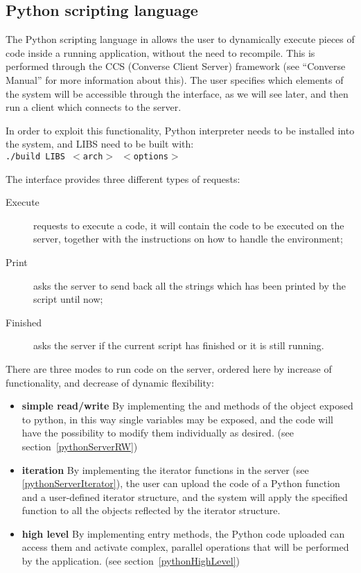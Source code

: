 \subsection{Python scripting language}

\label{python}

The Python scripting language in \charmpp{} allows the user to dynamically
execute pieces of code inside a running application, without the need to
recompile. This is performed through the CCS (Converse Client Server) framework
(see ``Converse Manual'' for more information about this). The user specifies
which elements of the system will be accessible through the interface, as we
will see later, and then run a client which connects to the server.

In order to exploit this functionality, Python interpreter needs to be installed
into the system, and \charmpp{} LIBS need to be built with:\\
\texttt{./build LIBS $<$arch$>$ $<$options$>$}

The interface provides three different types of requests:

\begin{description}
\item[Execute] requests to execute a code, it will contain the code to be executed on the server, together with the instructions on how to handle the environment;
\item[Print] asks the server to send back all the strings which has been printed by the script until now;
\item[Finished] asks the server if the current script has finished or it is still running.
\end{description}

There are three modes to run code on the server, ordered here by increase of
functionality, and decrease of dynamic flexibility:
\begin{itemize}
\item \textbf{simple read/write} By implementing the  and  methods
of the object exposed to python, in this way single variables may be exposed,
and the code will have the possibility to modify them individually as desired.
(see section~\ref{pythonServerRW})
\item \textbf{iteration} By implementing the iterator functions in the server (see
\ref{pythonServerIterator}), the user can upload the code of a Python function
and a user-defined iterator structure, and the system will apply the specified
function to all the objects reflected by the iterator structure.
\item \textbf{high level} By implementing  entry methods, the Python code uploaded can access them and activate complex, parallel operations that will be performed by the \charmpp{} application. (see section~\ref{pythonHighLevel})
\end{itemize}

